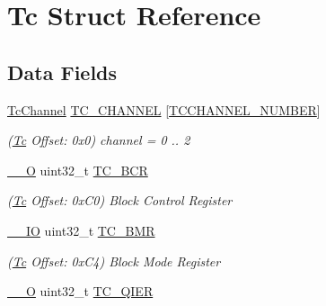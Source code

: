 \hypertarget{structTc}{}\section{Tc Struct Reference}
\label{structTc}
\subsection*{Data Fields}
\begin{DoxyCompactItemize}
\item 
\mbox{\label{structTc_a2c949f9914bdf329bda2a6a34f839886}} 
\mbox{\hyperlink{structTcChannel}{Tc\+Channel}} \mbox{\hyperlink{structTc_a2c949f9914bdf329bda2a6a34f839886}{T\+C\+\_\+\+C\+H\+A\+N\+N\+EL}} \mbox{[}\mbox{\hyperlink{group__SAMV71__TC_gade643c68c03a7a68a7a0795255b7873b}{T\+C\+C\+H\+A\+N\+N\+E\+L\+\_\+\+N\+U\+M\+B\+ER}}\mbox{]}
\begin{DoxyCompactList}\small\item\em (\mbox{\hyperlink{structTc}{Tc}} Offset\+: 0x0) channel = 0 .. 2 \end{DoxyCompactList}\item 
\mbox{\label{structTc_add680abf1976e4aa74e780a8afabdc98}} 
\mbox{\hyperlink{core__cm7_8h_a7e25d9380f9ef903923964322e71f2f6}{\+\_\+\+\_\+O}} uint32\+\_\+t \mbox{\hyperlink{structTc_add680abf1976e4aa74e780a8afabdc98}{T\+C\+\_\+\+B\+CR}}
\begin{DoxyCompactList}\small\item\em (\mbox{\hyperlink{structTc}{Tc}} Offset\+: 0x\+C0) Block Control Register \end{DoxyCompactList}\item 
\mbox{\label{structTc_a7698401b4a2eac1d1f446beeafe055f2}} 
\mbox{\hyperlink{core__cm7_8h_aec43007d9998a0a0e01faede4133d6be}{\+\_\+\+\_\+\+IO}} uint32\+\_\+t \mbox{\hyperlink{structTc_a7698401b4a2eac1d1f446beeafe055f2}{T\+C\+\_\+\+B\+MR}}
\begin{DoxyCompactList}\small\item\em (\mbox{\hyperlink{structTc}{Tc}} Offset\+: 0x\+C4) Block Mode Register \end{DoxyCompactList}\item 
\mbox{\label{structTc_adf1c2a721c6df49b1adec48465ba72bd}} 
\mbox{\hyperlink{core__cm7_8h_a7e25d9380f9ef903923964322e71f2f6}{\+\_\+\+\_\+O}} uint32\+\_\+t \mbox{\hyperlink{structTc_adf1c2a721c6df49b1adec48465ba72bd}{T\+C\+\_\+\+Q\+I\+ER}}

\end{DoxyCompactItemize}
